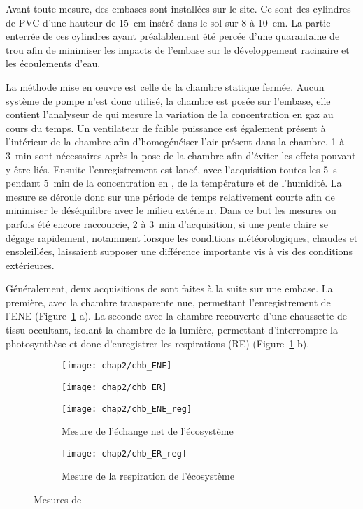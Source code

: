Avant toute mesure, des embases sont installées sur le site.
Ce sont des cylindres de PVC d'une hauteur de \SI{15}{\centi\metre} inséré dans le sol sur 8 à \SI{10}{\centi\metre}.
La partie enterrée de ces cylindres ayant préalablement été percée d'une quarantaine de trou afin de minimiser les impacts de l'embase sur le développement racinaire et les écoulements d'eau.

La méthode mise en œuvre est celle de la chambre statique fermée.
Aucun système de pompe n'est donc utilisé, la chambre est posée sur l'embase, elle contient l'analyseur de \coo qui mesure la variation de la concentration en gaz au cours du temps.
Un ventilateur de faible puissance est également présent à l'intérieur de la chambre afin d'homogénéiser l'air présent dans la chambre.
1 à \SI{3}{\minute} sont nécessaires après la pose de la chambre afin d'éviter les effets pouvant y être liés.
Ensuite l’enregistrement est lancé, avec l'acquisition toutes les \SI{5}{\second} pendant \SI{5}{\minute} de la concentration en \coo, de la température et de l'humidité.
La mesure se déroule donc sur une période de temps relativement courte afin de minimiser le déséquilibre avec le milieu extérieur.
Dans ce but les mesures on parfois été encore raccourcie, 2 à \SI{3}{\minute} d'acquisition, si une pente claire se dégage rapidement, notamment lorsque les conditions météorologiques, chaudes et ensoleillées, laissaient supposer une différence importante vis à vis des conditions extérieures.

Généralement, deux acquisitions de \coo sont faites à la suite sur une embase.
La première, avec la chambre transparente nue, permettant l'enregistrement de l'ENE (Figure~\ref{fig:chb}-a).
La seconde avec la chambre recouverte d'une chaussette de tissu occultant, isolant la chambre de la lumière, permettant d'interrompre la photosynthèse et donc d'enregistrer les respirations (RE) (Figure~\ref{fig:chb}-b).

\begin{figure}
	\centering
	\begin{subfigure}[t]{0.5\textwidth}
		\centering
		\texttt{[image: chap2/chb\_ENE]}
	\end{subfigure}%
	\begin{subfigure}[t]{0.5\textwidth}
		\centering
		\texttt{[image: chap2/chb\_ER]}
	\end{subfigure}%

	\begin{subfigure}[t]{0.5\textwidth}
		\texttt{[image: chap2/chb\_ENE\_reg]}
		\caption{Mesure de l'échange net de l'écosystème}
	\end{subfigure}%
	\begin{subfigure}[t]{0.5\textwidth}
		\texttt{[image: chap2/chb\_ER\_reg]}
		\caption{Mesure de la respiration de l'écosystème}
	\end{subfigure}
\caption{Mesures de \coo}
\label{fig:chb}
\end{figure}


